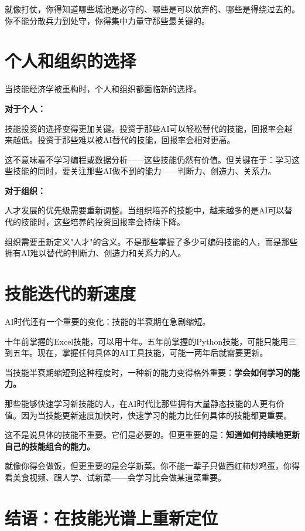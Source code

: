 就像打仗，你得知道哪些城池是必守的、哪些是可以放弃的、哪些是得绕过去的。你不能分散兵力到处守，你得集中力量守那些最关键的。

\section{个人和组织的选择}


当技能经济学被重构时，个人和组织都面临新的选择。

\textbf{对于个人：}

技能投资的选择变得更加关键。投资于那些AI可以轻松替代的技能，回报率会越来越低。投资于那些难以被AI替代的技能，回报率会相对更高。

这不意味着不学习编程或数据分析——这些技能仍然有价值。但关键在于：学习这些技能的同时，要关注那些AI做不到的能力——判断力、创造力、关系力。

\textbf{对于组织：}

人才发展的优先级需要重新调整。当组织培养的技能中，越来越多的是AI可以替代的技能时，这些培养的投资回报率会持续下降。

组织需要重新定义"人才"的含义。不是那些掌握了多少可编码技能的人，而是那些拥有AI难以替代的判断力、创造力和关系力的人。

\section{技能迭代的新速度}


AI时代还有一个重要的变化：技能的半衰期在急剧缩短。

十年前掌握的Excel技能，可以用十年。五年前掌握的Python技能，可能只能用三到五年。现在，掌握任何具体的AI工具技能，可能一两年后就需要更新。

当技能半衰期缩短到这种程度时，一种新的能力变得格外重要：\textbf{学会如何学习的能力。}

那些能够快速学习新技能的人，在AI时代比那些拥有大量静态技能的人更有价值。因为当技能更新速度加快时，快速学习的能力比任何具体的技能都更重要。

这不是说具体的技能不重要。它们是必要的。但更重要的是：\textbf{知道如何持续地更新自己的技能组合的能力。}

就像你得会做饭，但更重要的是会学新菜。你不能一辈子只做西红柿炒鸡蛋，你得看美食视频、跟人学、试新菜——会学习比会做某道菜重要。

\section{结语：在技能光谱上重新定位}


